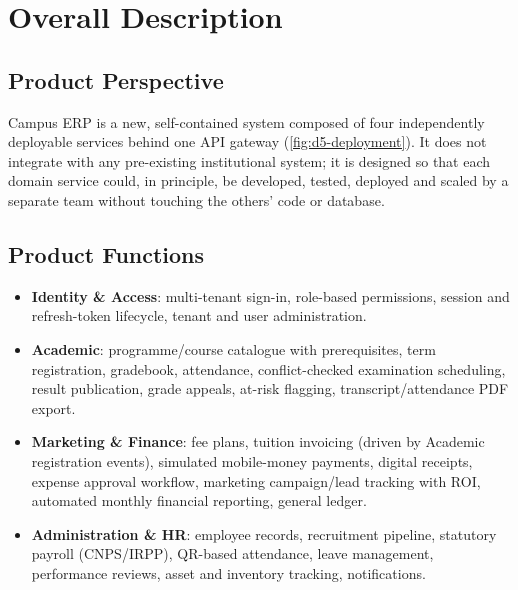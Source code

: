 \section{Overall Description}
\label{sec:overall-description}

\subsection{Product Perspective}
Campus ERP is a new, self-contained system composed of four independently
deployable services behind one API gateway (\cref{fig:d5-deployment}). It does
not integrate with any pre-existing institutional system; it is designed so
that each domain service could, in principle, be developed, tested, deployed
and scaled by a separate team without touching the others' code or database.

\subsection{Product Functions}
\begin{itemize}[leftmargin=1.4em]
  \item \textbf{Identity \& Access}: multi-tenant sign-in, role-based
    permissions, session and refresh-token lifecycle, tenant and user
    administration.
  \item \textbf{Academic}: programme/course catalogue with prerequisites,
    term registration, gradebook, attendance, conflict-checked examination
    scheduling, result publication, grade appeals, at-risk flagging,
    transcript/attendance PDF export.
  \item \textbf{Marketing \& Finance}: fee plans, tuition invoicing (driven by
    Academic registration events), simulated mobile-money payments, digital
    receipts, expense approval workflow, marketing campaign/lead tracking with
    ROI, automated monthly financial reporting, general ledger.
  \item \textbf{Administration \& HR}: employee records, recruitment pipeline,
    statutory payroll (CNPS/IRPP), QR-based attendance, leave management,
    performance reviews, asset and inventory tracking, notifications.
\end{itemize}

